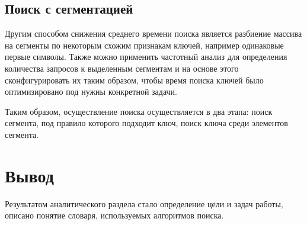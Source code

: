 \subsection{Поиск с сегментацией}
	Другим способом снижения среднего времени поиска является разбиение массива на сегменты по некоторым схожим признакам ключей, например одинаковые первые символы. Также можно применить частотный анализ для определения количества запросов к выделенным сегментам и на основе этого сконфигурировать их таким образом, чтобы время поиска ключей было оптимизировано под нужны конкретной задачи.
	
	Таким образом, осуществление поиска осуществляется в два этапа: поиск сегмента, под правило которого подходит ключ, поиск ключа среди элементов сегмента.

\section*{Вывод}
Результатом аналитического раздела стало определение цели и задач работы, описано понятие словаря, используемых алгоритмов поиска.